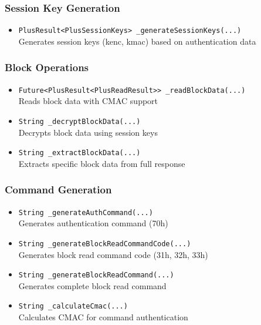 \documentclass[a4paper,12pt]{article}
\begin{document}
\subsubsection*{Session Key Generation}
\begin{itemize}
    \item \texttt{PlusResult<PlusSessionKeys> \_generateSessionKeys(...)}\\
    Generates session keys (kenc, kmac) based on authentication data
\end{itemize}

\subsubsection*{Block Operations}
\begin{itemize}
    \item \texttt{Future<PlusResult<PlusReadResult>> \_readBlockData(...)}\\
    Reads block data with CMAC support
    
    \item \texttt{String \_decryptBlockData(...)}\\
    Decrypts block data using session keys
    
    \item \texttt{String \_extractBlockData(...)}\\
    Extracts specific block data from full response
\end{itemize}

\subsubsection*{Command Generation}
\begin{itemize}
    \item \texttt{String \_generateAuthCommand(...)}\\
    Generates authentication command (70h)
    
    \item \texttt{String \_generateBlockReadCommandCode(...)}\\
    Generates block read command code (31h, 32h, 33h)
    
    \item \texttt{String \_generateBlockReadCommand(...)}\\
    Generates complete block read command
    
    \item \texttt{String \_calculateCmac(...)}\\
    Calculates CMAC for command authentication
\end{itemize}
\end{document}

